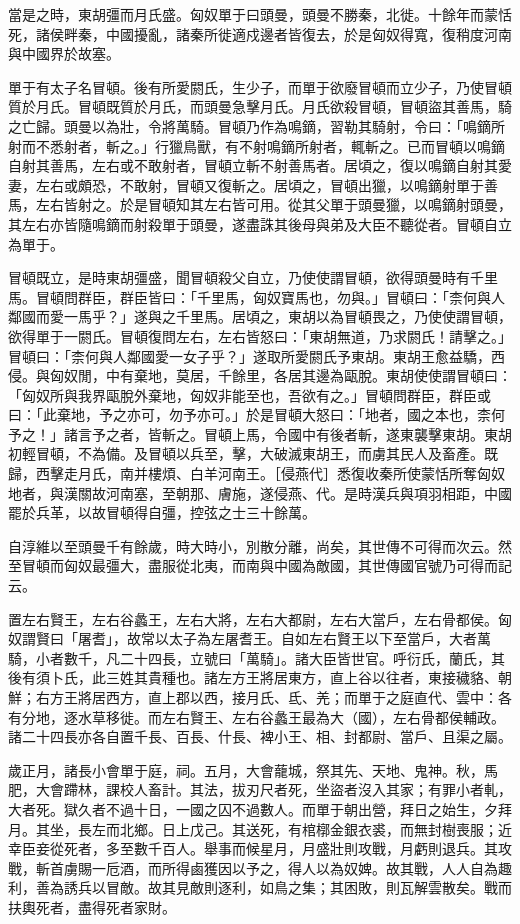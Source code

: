 \begin{pinyinscope}
當是之時，東胡彊而月氏盛。匈奴單于曰頭曼，頭曼不勝秦，北徙。十餘年而蒙恬死，諸侯畔秦，中國擾亂，諸秦所徙適戍邊者皆復去，於是匈奴得寬，復稍度河南與中國界於故塞。

單于有太子名冒頓。後有所愛閼氏，生少子，而單于欲廢冒頓而立少子，乃使冒頓質於月氏。冒頓既質於月氏，而頭曼急擊月氏。月氏欲殺冒頓，冒頓盜其善馬，騎之亡歸。頭曼以為壯，令將萬騎。冒頓乃作為鳴鏑，習勒其騎射，令曰：「鳴鏑所射而不悉射者，斬之。」行獵鳥獸，有不射鳴鏑所射者，輒斬之。已而冒頓以鳴鏑自射其善馬，左右或不敢射者，冒頓立斬不射善馬者。居頃之，復以鳴鏑自射其愛妻，左右或頗恐，不敢射，冒頓又復斬之。居頃之，冒頓出獵，以鳴鏑射單于善馬，左右皆射之。於是冒頓知其左右皆可用。從其父單于頭曼獵，以鳴鏑射頭曼，其左右亦皆隨鳴鏑而射殺單于頭曼，遂盡誅其後母與弟及大臣不聽從者。冒頓自立為單于。

冒頓既立，是時東胡彊盛，聞冒頓殺父自立，乃使使謂冒頓，欲得頭曼時有千里馬。冒頓問群臣，群臣皆曰：「千里馬，匈奴寶馬也，勿與。」冒頓曰：「柰何與人鄰國而愛一馬乎？」遂與之千里馬。居頃之，東胡以為冒頓畏之，乃使使謂冒頓，欲得單于一閼氏。冒頓復問左右，左右皆怒曰：「東胡無道，乃求閼氏！請擊之。」冒頓曰：「柰何與人鄰國愛一女子乎？」遂取所愛閼氏予東胡。東胡王愈益驕，西侵。與匈奴閒，中有棄地，莫居，千餘里，各居其邊為甌脫。東胡使使謂冒頓曰：「匈奴所與我界甌脫外棄地，匈奴非能至也，吾欲有之。」冒頓問群臣，群臣或曰：「此棄地，予之亦可，勿予亦可。」於是冒頓大怒曰：「地者，國之本也，柰何予之！」諸言予之者，皆斬之。冒頓上馬，令國中有後者斬，遂東襲擊東胡。東胡初輕冒頓，不為備。及冒頓以兵至，擊，大破滅東胡王，而虜其民人及畜產。既歸，西擊走月氏，南并樓煩、白羊河南王。［侵燕代］悉復收秦所使蒙恬所奪匈奴地者，與漢關故河南塞，至朝那、膚施，遂侵燕、代。是時漢兵與項羽相距，中國罷於兵革，以故冒頓得自彊，控弦之士三十餘萬。

自淳維以至頭曼千有餘歲，時大時小，別散分離，尚矣，其世傳不可得而次云。然至冒頓而匈奴最彊大，盡服從北夷，而南與中國為敵國，其世傳國官號乃可得而記云。

置左右賢王，左右谷蠡王，左右大將，左右大都尉，左右大當戶，左右骨都侯。匈奴謂賢曰「屠耆」，故常以太子為左屠耆王。自如左右賢王以下至當戶，大者萬騎，小者數千，凡二十四長，立號曰「萬騎」。諸大臣皆世官。呼衍氏，蘭氏，其後有須卜氏，此三姓其貴種也。諸左方王將居東方，直上谷以往者，東接穢貉、朝鮮；右方王將居西方，直上郡以西，接月氏、氐、羌；而單于之庭直代、雲中：各有分地，逐水草移徙。而左右賢王、左右谷蠡王最為大（國），左右骨都侯輔政。諸二十四長亦各自置千長、百長、什長、裨小王、相、封都尉、當戶、且渠之屬。

歲正月，諸長小會單于庭，祠。五月，大會蘢城，祭其先、天地、鬼神。秋，馬肥，大會蹛林，課校人畜計。其法，拔刃尺者死，坐盜者沒入其家；有罪小者軋，大者死。獄久者不過十日，一國之囚不過數人。而單于朝出營，拜日之始生，夕拜月。其坐，長左而北鄉。日上戊己。其送死，有棺槨金銀衣裘，而無封樹喪服；近幸臣妾從死者，多至數千百人。舉事而候星月，月盛壯則攻戰，月虧則退兵。其攻戰，斬首虜賜一卮酒，而所得鹵獲因以予之，得人以為奴婢。故其戰，人人自為趣利，善為誘兵以冒敵。故其見敵則逐利，如鳥之集；其困敗，則瓦解雲散矣。戰而扶輿死者，盡得死者家財。


\end{pinyinscope}
